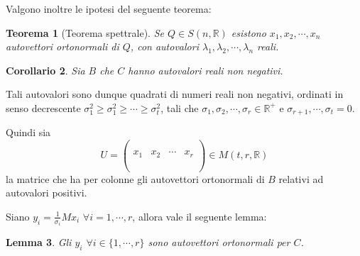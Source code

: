 \documentclass[12pt,a4paper]{article}
\theoremstyle{thm}
\newtheorem{theorem}{Teorema}[section]
\newtheorem{lemma}[theorem]{Lemma}
\newtheorem{corollary}[theorem]{Corollario}
\theoremstyle{def}
\begin{document}
Valgono inoltre le ipotesi del seguente teorema:

\begin{theorem}[Teorema spettrale]
Se $Q \in S(n, \mathds{R})$ esistono $ x_1, x_2, \cdots, x_n$ autovettori ortonormali di $Q$, con autovalori $\lambda_1, \lambda_2, \cdots, \lambda_n$ reali.
\end{theorem}


\begin{corollary}
Sia $B$ che $C$ hanno autovalori reali non negativi.
\end{corollary}

\vspace{0.5cm}

Tali autovalori sono dunque quadrati di numeri reali non negativi, ordinati in senso decrescente $\sigma_1^2 \ge \sigma_1^2 \ge \cdots \ge \sigma_t^2$, tali che
$\sigma_1, \sigma_2, \cdots, \sigma_r \in \mathds{R}^+$ e $\sigma_{r+1}, \cdots, \sigma_t = 0$.


Quindi sia $$U = \left(\begin{array}{c|c|c|c} & & & \\ & & & \\ x_1 & x_2 & \cdots& x_r\\ & & & \\ & & & \\ \end{array}\right) \in M(t,r, \mathds{R})$$ la matrice che ha per colonne gli autovettori ortonormali di $B$ relativi ad autovalori positivi.

\vspace{0.5cm}
Siano $y_i = \frac{1}{\sigma_i} Mx_i$ $\forall i=1, \cdots, r$, allora vale il seguente lemma:

\begin{lemma}
Gli $y_i$ $\forall i \in \{1, \cdots, r\}$ sono autovettori ortonormali per $C$.
\end{lemma}

\newpage
\end{document}
